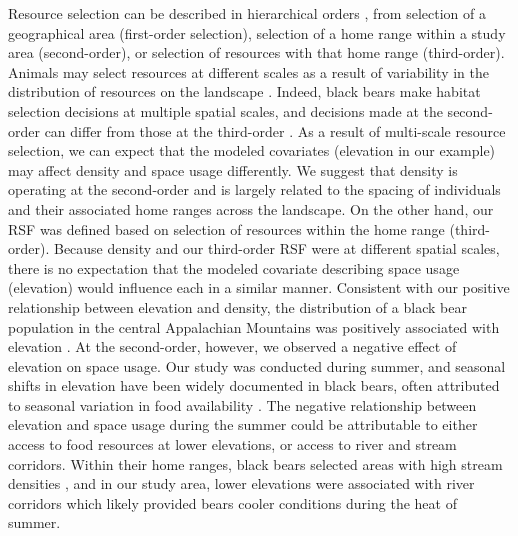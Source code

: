 \documentclass[12pt]{article}
\begin{document}
Resource selection can be described in
hierarchical orders \citep{johnson:1980}, from selection of a geographical
area (first-order selection), selection of a home range within a study
area (second-order), or selection of resources with that home range
(third-order).  Animals may select resources at different scales as a
result of variability in the distribution of resources on the
landscape \citep{mayor_etal:2009}.  Indeed, black bears make habitat
selection decisions at multiple spatial scales, and decisions made at
the second-order can differ from those at the third-order
\citep{lyons_etal:2003, sadeghpour_ginnett:2011}.
  As a result of multi-scale
resource selection, we can expect that the modeled covariates
(elevation in our example) may affect density and space usage
differently.  We suggest that density is operating at the second-order
and is largely related to the spacing of individuals and their
associated home ranges across the landscape.  On the other hand, our RSF was defined
based on selection of resources within the home range (third-order).
Because density and our third-order RSF were at different spatial
scales, there is no expectation that the modeled covariate describing
space usage (elevation) would influence each in a similar manner.
Consistent with our positive relationship between elevation and
density, the distribution of a black bear population in the central
Appalachian Mountains was positively associated with elevation \citep{frary_etal:2011}.
 At the second-order, however, we observed a negative
effect of elevation on space usage.  Our study was conducted during
summer, and seasonal shifts in elevation have been widely documented
in black bears, often attributed to seasonal variation in food
availability \citep{reynolds_beecham:1980,
graber_white:1983}.
 The negative relationship between elevation and space
usage during the summer could be attributable to either access to food
resources at lower elevations, or access to river and stream
corridors.  Within their home ranges, black bears selected areas with
high stream densities \citep{fecske_etal:2002}, and in our study area,
lower elevations were associated with river corridors which likely
provided bears cooler conditions during the heat of summer.
\end{document}
